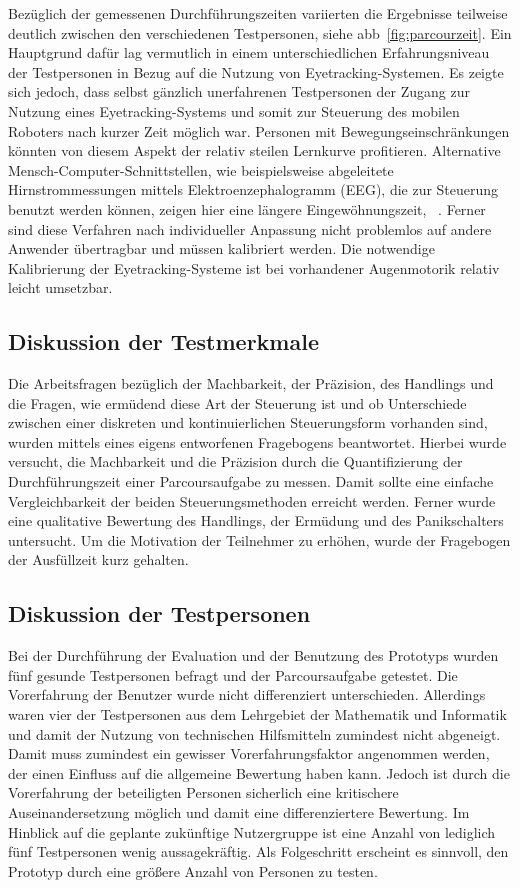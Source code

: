 Bezüglich der gemessenen Durchführungszeiten variierten die Ergebnisse teilweise deutlich zwischen den verschiedenen Testpersonen, siehe \acs{abb}~\ref{fig:parcourzeit}. Ein Hauptgrund dafür lag vermutlich in einem unterschiedlichen Erfahrungsniveau der Testpersonen in Bezug auf die Nutzung von Eyetracking-Systemen. Es zeigte sich jedoch, dass selbst gänzlich unerfahrenen Testpersonen der Zugang zur Nutzung eines Eyetracking-Systems und somit zur Steuerung des mobilen Roboters nach kurzer Zeit möglich war. Personen mit Bewegungseinschränkungen könnten von diesem Aspekt der relativ steilen Lernkurve profitieren. Alternative Mensch-Computer-Schnittstellen, wie beispielsweise abgeleitete Hirnstrommessungen mittels Elektroenzephalogramm (EEG), die zur Steuerung benutzt werden können, zeigen hier eine längere Eingewöhnungszeit, \vgl~\cite{Tonin2011}. Ferner sind diese Verfahren nach individueller Anpassung nicht problemlos auf andere Anwender übertragbar und müssen kalibriert werden. Die notwendige Kalibrierung der Eyetracking-Systeme ist bei vorhandener Augenmotorik relativ leicht umsetzbar. 

\subsection{Diskussion der Testmerkmale}
Die Arbeitsfragen bezüglich der Machbarkeit, der Präzision, des Handlings und die Fragen, wie ermüdend diese Art der Steuerung ist und ob Unterschiede zwischen einer diskreten und kontinuierlichen Steuerungsform vorhanden sind, wurden mittels eines eigens entworfenen Fragebogens beantwortet. Hierbei wurde versucht, die Machbarkeit und die Präzision durch die Quantifizierung der Durchführungszeit einer Parcoursaufgabe zu messen. Damit sollte eine einfache Vergleichbarkeit der beiden Steuerungsmethoden erreicht werden. Ferner wurde eine qualitative Bewertung des Handlings, der Ermüdung und des Panikschalters untersucht. Um die Motivation der Teilnehmer zu erhöhen, wurde der Fragebogen \bzgl der Ausfüllzeit kurz gehalten. 

\subsection{Diskussion der Testpersonen}
Bei der Durchführung der Evaluation und der Benutzung des Prototyps wurden fünf gesunde Testpersonen befragt und \bzgl der Parcoursaufgabe getestet. Die Vorerfahrung der Benutzer wurde nicht differenziert unterschieden. Allerdings waren vier der Testpersonen aus dem Lehrgebiet der Mathematik und Informatik und damit der Nutzung von technischen Hilfsmitteln zumindest nicht abgeneigt. Damit muss zumindest ein gewisser Vorerfahrungsfaktor angenommen werden, der einen Einfluss auf die allgemeine Bewertung haben kann. Jedoch ist durch die Vorerfahrung der beteiligten Personen sicherlich eine kritischere Auseinandersetzung möglich und damit eine differenziertere Bewertung. Im Hinblick auf die geplante zukünftige Nutzergruppe ist eine Anzahl von lediglich fünf Testpersonen wenig aussagekräftig. Als Folgeschritt erscheint es sinnvoll, den Prototyp durch eine größere Anzahl von Personen zu testen.

